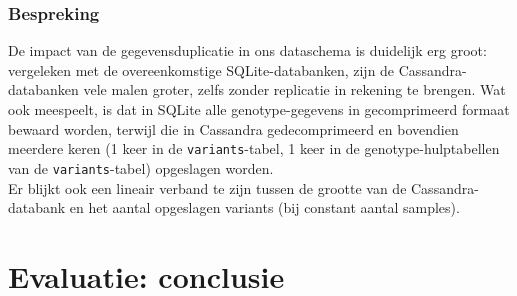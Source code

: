 \subsubsection{Bespreking}

De impact van de gegevensduplicatie in ons dataschema is duidelijk erg groot: vergeleken met de overeenkomstige SQLite-databanken, zijn de Cassandra-databanken vele malen groter, zelfs zonder replicatie in rekening te brengen. Wat ook meespeelt, is dat in SQLite alle genotype-gegevens in gecomprimeerd formaat bewaard worden, terwijl die in Cassandra gedecomprimeerd en bovendien meerdere keren (1 keer in de \texttt{variants}-tabel, 1 keer in de genotype-hulptabellen van de \texttt{variants}-tabel) opgeslagen worden.\\
Er blijkt ook een lineair verband te zijn tussen de grootte van de Cassandra-databank en het aantal opgeslagen variants (bij constant aantal samples).

\section{Evaluatie: conclusie}

